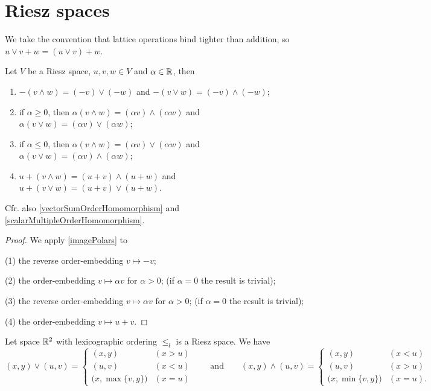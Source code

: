 \section{Riesz spaces}

We take the convention that lattice operations bind tighter than addition, so $u\vee v + w = (u\vee v) + w$.

\begin{lemma} \label{lemmaRieszSpaces}
Let $V$ be a Riesz space, $u,v,w\in V$ and $\alpha\in \mathbb{R}$, then
\begin{enumerate}
\item $-(v \wedge w) = (-v)\vee (-w)$ and $-(v \vee w) = (-v)\wedge (-w)$;
\item if $\alpha \geq 0$, then $\alpha(v \wedge w) = (\alpha v)\wedge (\alpha w)$ and $\alpha(v \vee w) = (\alpha v)\vee (\alpha w)$;
\item if $\alpha \leq 0$, then $\alpha(v \wedge w) = (\alpha v)\vee (\alpha w)$ and $\alpha(v \vee w) = (\alpha v)\wedge (\alpha w)$;
\item $u+(v \wedge w) = (u+v)\wedge (u+w)$ and $u+(v \vee w) = (u+v)\vee (u+w)$.
\end{enumerate}
\end{lemma}
Cfr. also \ref{vectorSumOrderHomomorphism} and \ref{scalarMultipleOrderHomomorphism}.
\begin{proof}
We apply \ref{imagePolars} to

(1) the reverse order-embedding $v\mapsto -v$;

(2) the order-embedding $v\mapsto \alpha v$ for $\alpha > 0$; (if $\alpha = 0$ the result is trivial);

(3) the reverse order-embedding $v\mapsto \alpha v$ for $\alpha > 0$; (if $\alpha = 0$ the result is trivial);

(4) the order-embedding $v\mapsto u+v$.
\end{proof}

\begin{example}
Let space $\mathbb{R}^2$ with lexicographic ordering $\leq_l$ is a Riesz space. We have
\[ (x,y)\vee (u,v) = \begin{cases}
(x,y) & (x>u) \\ (u,v) & (x<u) \\ \big(x, \max\{v,y\}\big) & (x = u)
\end{cases} \qquad\text{and}\qquad (x,y)\wedge (u,v) = \begin{cases}
(x,y) & (x<u) \\ (u,v) & (x>u) \\ \big(x, \min\{v,y\}\big) & (x = u).
\end{cases} \]
\end{example}

